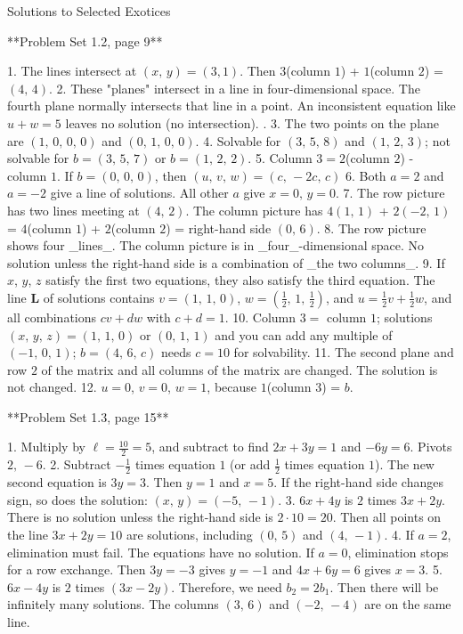 Solutions to Selected Exotices

**Problem Set 1.2, page 9**

1. The lines intersect at \((x,\,y)=(3,1)\). Then \(3\)(column \(1\)) + \(1\)(column \(2\)) = \((4,\,4)\).
2. These "planes" intersect in a line in four-dimensional space. The fourth plane normally intersects that line in a point. An inconsistent equation like \(u+w=5\) leaves no solution (no intersection). .
3. The two points on the plane are \((1,\,0,\,0,\,0)\) and \((0,\,1,\,0,\,0)\).
4. Solvable for \((3,\,5,\,8)\) and \((1,\,2,\,3)\); not solvable for \(b=(3,\,5,\,7)\) or \(b=(1,\,2,\,2)\).
5. Column \(3=2\)(column \(2\)) - column \(1\). If \(b=(0,\,0,\,0)\), then \((u,\,v,\,w)=(c,\,-2c,\,c)\)
6. Both \(a=2\) and \(a=-2\) give a line of solutions. All other \(a\) give \(x=0,\,y=0\).
7. The row picture has two lines meeting at \((4,\,2)\). The column picture has \(4(1,\,1)\) + \(2(-2,\,1)\) = \(4\)(column \(1\)) + \(2\)(column \(2\)) = right-hand side \((0,\,6)\).
8. The row picture shows four _lines_. The column picture is in _four_-dimensional space. No solution unless the right-hand side is a combination of _the two columns_.
9. If \(x\), \(y\), \(z\) satisfy the first two equations, they also satisfy the third equation. The line \(\mathbf{L}\) of solutions contains \(v=(1,\,1,\,0)\), \(w=\left(\frac{1}{2},\,1,\,\frac{1}{2}\right)\), and \(u=\frac{1}{2}v+\frac{1}{2}w\), and all combinations \(cv+dw\) with \(c+d=1\).
10. Column \(3=\) column \(1\); solutions \((x,\,y,\,z)=(1,\,1,\,0)\) or \((0,\,1,\,1)\) and you can add any multiple of \((-1,\,0,\,1)\); \(b=(4,\,6,\,c)\) needs \(c=10\) for solvability.
11. The second plane and row \(2\) of the matrix and all columns of the matrix are changed. The solution is not changed.
12. \(u=0\), \(v=0\), \(w=1\), because \(1\)(column \(3\)) = \(b\).

**Problem Set 1.3, page 15**

1. Multiply by \(\ell=\frac{10}{2}=5\), and subtract to find \(2x+3y=1\) and \(-6y=6\). Pivots \(2,\,-6\).
2. Subtract \(-\frac{1}{2}\) times equation \(1\) (or add \(\frac{1}{2}\) times equation \(1\)). The new second equation is \(3y=3\). Then \(y=1\) and \(x=5\). If the right-hand side changes sign, so does the solution: \((x,\,y)=(-5,\,-1)\).
3. \(6x+4y\) is \(2\) times \(3x+2y\). There is no solution unless the right-hand side is \(2\cdot 10=20\). Then all points on the line \(3x+2y=10\) are solutions, including \((0,\,5)\) and \((4,\,-1)\).
4. If \(a=2\), elimination must fail. The equations have no solution. If \(a=0\), elimination stops for a row exchange. Then \(3y=-3\) gives \(y=-1\) and \(4x+6y=6\) gives \(x=3\).
5. \(6x-4y\) is \(2\) times \((3x-2y)\). Therefore, we need \(b_{2}=2b_{1}\). Then there will be infinitely many solutions. The columns \((3,\,6)\) and \((-2,\,-4)\) are on the same line.

 